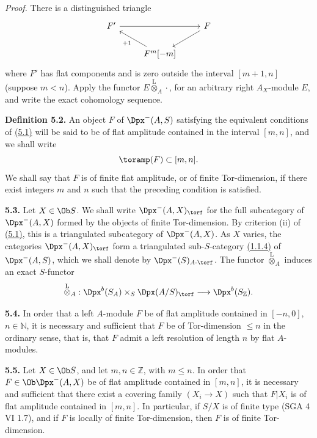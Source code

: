\emph{Proof.} There is a distinguished triangle
\[
\begin{tikzcd}
F' \arrow[rr] && F \arrow[dl]\\
& F^m[-m] \arrow[ul,"+1"] &
\end{tikzcd}
\]
where \(F'\) has flat components and is zero outside the interval \([m+1,n]\) (suppose \(m<n\)). Apply the functor \(E\overset{\mathrm L}{\otimes}_A\cdot\), for an arbitrary right \(A_X\)-module \(E\), and write the exact cohomology sequence.

\textbf{Definition 5.2.} An object \(F\) of \(\Dpx^-(A,S)\) satisfying the equivalent conditions of \hyperlink{sga6.e01.prop.5-1}{(5.1)} will be said to be of flat amplitude contained in the interval \([m,n]\), and we shall write
\[
  \toramp(F)\subset[m,n].
\]
We shall say that \(F\) is of finite flat amplitude, or of finite Tor-dimension, if there exist integers \(m\) and \(n\) such that the preceding condition is satisfied.

\textbf{5.3.} Let \(X\in\Ob S\). We shall write \(\Dpx^-(A,X)_{\torf}\) for the full subcategory of \(\Dpx^-(A,X)\) formed by the objects of finite Tor-dimension. By criterion (ii) of \hyperlink{sga6.e01.prop.5-1}{(5.1)}, this is a triangulated subcategory of \(\Dpx^-(A,X)\). As \(X\) varies, the categories \(\Dpx^-(A,X)_{\torf}\) form a triangulated sub-\(S\)-category \hyperlink{sga6.e01.para.1-1-4}{(1.1.4)} of \(\Dpx^-(A,S)\), which we shall denote by \(\Dpx^-(S)_{A\text{-}\torf}\). The functor \(\overset{\mathrm L}{\otimes}_A\) induces an exact \(S\)-functor
\[
  \overset{\mathrm L}{\otimes}_A:
  \Dpx^b(S_A)\times_S \Dpx(A/S)_{\torf}
  \longrightarrow \Dpx^b(S_{\mathbb Z}).
\]

\textbf{5.4.} In order that a left \(A\)-module \(F\) be of flat amplitude contained in \([-n,0]\), \(n\in\mathbb N\), it is necessary and sufficient that \(F\) be of Tor-dimension \(\leq n\) in the ordinary sense, that is, that \(F\) admit a left resolution of length \(n\) by flat \(A\)-modules.

\textbf{5.5.} Let \(X\in\Ob S\), and let \(m,n\in\mathbb Z\), with \(m\leq n\). In order that \(F\in\Ob\Dpx^-(A,X)\) be of flat amplitude contained in \([m,n]\), it is necessary and sufficient that there exist a covering family \((X_i\to X)\) such that \(F|X_i\) is of flat amplitude contained in \([m,n]\). In particular, if \(S/X\) is of finite type (SGA 4 VI 1.7), and if \(F\) is locally of finite Tor-dimension, then \(F\) is of finite Tor-dimension.

